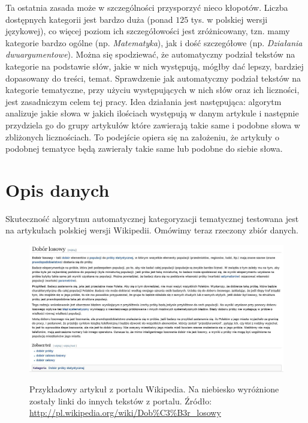\documentclass{praca1}
\begin{document}
Ta ostatnia zasada może w szczególności przysporzyć nieco kłopotów. Liczba dostępnych kategorii jest bardzo duża (ponad $125$ tys. w polskiej wersji językowej), co więcej poziom ich szczegółowości jest zróżnicowany, tzn. mamy kategorie bardzo ogólne (np. \emph{Matematyka}), jak i dość szczegółowe (np. \emph{Działania dwuargumentowe}). Można się spodziewać, że automatyczny podział tekstów na kategorie na podstawie słów, jakie w nich występują, mógłby dać lepszy, bardziej dopasowany do treści, temat. Sprawdzenie jak automatyczny podział tekstów na kategorie tematyczne, przy użyciu występujących w nich słów oraz ich liczności, jest zasadniczym celem tej pracy. Idea działania jest następująca: algorytm analizuje jakie słowa w jakich ilościach występują w danym artykule i następnie przydziela go do grupy artykułów które zawierają takie same i podobne słowa w zbliżonych licznościach. To podejście opiera się na założeniu, że artykuły o podobnej tematyce będą zawierały takie same lub podobne do siebie słowa. 

\section{Opis danych}

Skuteczność algorytmu automatycznej kategoryzacji tematycznej testowana jest na artykułach polskiej wersji Wikipedii. Omówimy teraz rzeczony zbiór danych.

\begin{figure}
  \centering
  \includegraphics[width=450pt]{wiki2.jpg}\\
  \caption{Przykładowy artykuł z portalu Wikipedia. Na niebiesko wyróżnione zostały linki do innych tekstów z portalu. Źródło: \url{http://pl.wikipedia.org/wiki/Dob\%C3\%B3r\_losowy}}\label{wiki}
\end{figure}
\end{document}
